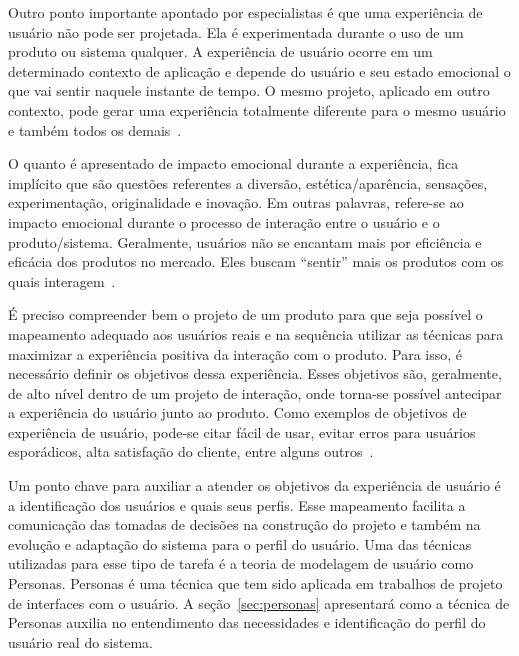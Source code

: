 Outro ponto importante apontado por especialistas é que uma experiência de usuário não pode ser projetada. Ela é experimentada durante o uso de um produto ou sistema qualquer. A experiência de usuário ocorre em um determinado contexto de aplicação e depende do usuário e seu estado emocional o que vai sentir naquele instante de tempo. O mesmo projeto, aplicado em outro contexto, pode gerar uma experiência totalmente diferente para o mesmo usuário e também todos os demais~\cite{hartson:2012}.

O quanto é apresentado de impacto emocional durante a experiência, fica implícito que são questões referentes a diversão, estética/aparência, sensações, experimentação, originalidade e inovação. Em outras palavras, refere-se ao impacto emocional durante o processo de interação entre o usuário e o produto/sistema. Geralmente, usuários não se encantam mais por eficiência e eficácia dos produtos no mercado. Eles buscam ``sentir'' mais os produtos com os quais interagem~\cite{hartson:2012}.


É preciso compreender bem o projeto de um produto para que seja possível o mapeamento adequado aos usuários reais e na sequência utilizar as técnicas para maximizar a experiência positiva da interação com o produto. Para isso, é necessário definir os objetivos dessa experiência. Esses objetivos são, geralmente, de alto nível dentro de um projeto de interação, onde torna-se possível antecipar a experiência do usuário junto ao produto. Como exemplos de objetivos de experiência de usuário, pode-se citar fácil de usar, evitar erros para usuários esporádicos, alta satisfação do cliente, entre alguns outros~\cite{hartson:2012}.

Um ponto chave para auxiliar a atender os objetivos da experiência de usuário é a identificação dos usuários e quais seus perfis. Esse mapeamento facilita a comunicação das tomadas de decisões na construção do projeto e também na evolução e adaptação do sistema para o perfil do usuário. Uma das técnicas utilizadas para esse tipo de tarefa é a teoria de modelagem de usuário como Personas. Personas é uma técnica que tem sido aplicada em trabalhos de projeto de interfaces com o usuário. A seção~\ref{sec:personas} apresentará como a técnica de Personas auxilia no entendimento das necessidades e identificação do perfil do usuário real do sistema.

